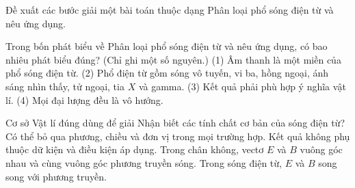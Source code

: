 \begin{bt}
Đề xuất các bước giải một bài toán thuộc dạng Phân loại phổ sóng điện từ và nêu ứng dụng.
\end{bt}

\begin{ex}
Trong bốn phát biểu về Phân loại phổ sóng điện từ và nêu ứng dụng, có bao nhiêu phát biểu đúng? (Chỉ ghi một số nguyên.) (1) Âm thanh là một miền của phổ sóng điện từ. (2) Phổ điện từ gồm sóng vô tuyến, vi ba, hồng ngoại, ánh sáng nhìn thấy, tử ngoại, tia $X$ và gamma. (3) Kết quả phải phù hợp ý nghĩa vật lí. (4) Mọi đại lượng đều là vô hướng.
\end{ex}

\begin{ex}
Cơ sở Vật lí đúng dùng để giải Nhận biết các tính chất cơ bản của sóng điện từ?
\choice
{Có thể bỏ qua phương, chiều và đơn vị trong mọi trường hợp.}
{Kết quả không phụ thuộc dữ kiện và điều kiện áp dụng.}
{\True Trong chân không, vectơ $E$ và $B$ vuông góc nhau và cùng vuông góc phương truyền sóng.}
{Trong sóng điện từ, $E$ và $B$ song song với phương truyền.}
\end{ex}

